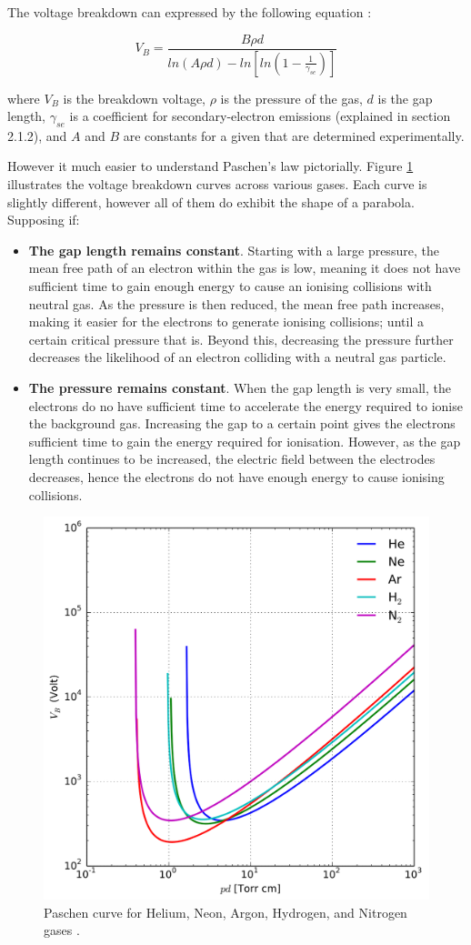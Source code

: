 The voltage breakdown can expressed by the following equation \cite{Lieberman2005}:

\begin{equation}
	V_B = \frac{B \rho d}{ln(A \rho d) - ln[ln(1-\frac{1}{\gamma_{se}})]}
\end{equation}

where $V_B$ is the breakdown voltage, $\rho$ is the pressure of the gas, $d$ is the gap length, $\gamma_{se}$ is a coefficient for secondary-electron emissions (explained in section 2.1.2), and $A$ and $B$ are constants for a given that are determined experimentally.

However it much easier to understand Paschen's law pictorially. Figure \ref{fig:pashen_curve} illustrates the voltage breakdown curves across various gases. Each curve is slightly different, however all of them do exhibit the shape of a parabola. Supposing if:

\begin{itemize}
	\item\textbf{The gap length remains constant}. Starting with a large pressure, the mean free path of an electron within the gas is low, meaning it does not have sufficient time to gain enough energy to cause an ionising collisions with neutral gas. As the pressure is then reduced, the mean free path increases, making it easier for the electrons to generate ionising collisions; until a certain critical pressure that is. Beyond this, decreasing the pressure further decreases the likelihood of an electron colliding with a neutral gas particle.

	\item\textbf{The pressure remains constant}. When the gap length is very small, the electrons do no have sufficient time to accelerate the energy required to ionise the background gas. Increasing the gap to a certain point gives the electrons sufficient time to gain the energy required for ionisation. However, as the gap length continues to be increased, the electric field between the electrodes decreases, hence the electrons do not have enough energy to cause ionising collisions.
\end{itemize}

\begin{figure}[h!]
	\centering
	\includegraphics[width=0.6\linewidth]{background/figures/paschen_curve.png}
	\caption{Paschen curve for Helium, Neon, Argon, Hydrogen, and Nitrogen gases \cite{Lieberman2005}.}
	\label{fig:pashen_curve}
\end{figure}

